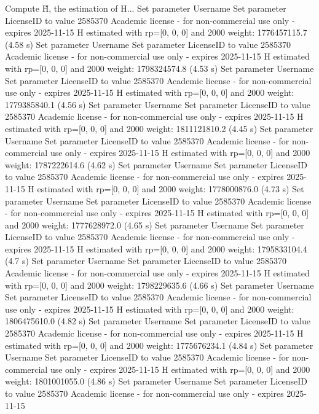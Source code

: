 Compute H̃, the estimation of H...
Set parameter Username
Set parameter LicenseID to value 2585370
Academic license - for non-commercial use only - expires 2025-11-15
  H estimated with rp=[0, 0, 0] and 2000 weight:  1776457115.7  (4.58 s)
Set parameter Username
Set parameter LicenseID to value 2585370
Academic license - for non-commercial use only - expires 2025-11-15
  H estimated with rp=[0, 0, 0] and 2000 weight:  1798324574.8  (4.53 s)
Set parameter Username
Set parameter LicenseID to value 2585370
Academic license - for non-commercial use only - expires 2025-11-15
  H estimated with rp=[0, 0, 0] and 2000 weight:  1779385840.1  (4.56 s)
Set parameter Username
Set parameter LicenseID to value 2585370
Academic license - for non-commercial use only - expires 2025-11-15
  H estimated with rp=[0, 0, 0] and 2000 weight:  1811121810.2  (4.45 s)
Set parameter Username
Set parameter LicenseID to value 2585370
Academic license - for non-commercial use only - expires 2025-11-15
  H estimated with rp=[0, 0, 0] and 2000 weight:  1787222614.6  (4.62 s)
Set parameter Username
Set parameter LicenseID to value 2585370
Academic license - for non-commercial use only - expires 2025-11-15
  H estimated with rp=[0, 0, 0] and 2000 weight:  1778000876.0  (4.73 s)
Set parameter Username
Set parameter LicenseID to value 2585370
Academic license - for non-commercial use only - expires 2025-11-15
  H estimated with rp=[0, 0, 0] and 2000 weight:  1777628972.0  (4.65 s)
Set parameter Username
Set parameter LicenseID to value 2585370
Academic license - for non-commercial use only - expires 2025-11-15
  H estimated with rp=[0, 0, 0] and 2000 weight:  1795833104.4  (4.7 s)
Set parameter Username
Set parameter LicenseID to value 2585370
Academic license - for non-commercial use only - expires 2025-11-15
  H estimated with rp=[0, 0, 0] and 2000 weight:  1798229635.6  (4.66 s)
Set parameter Username
Set parameter LicenseID to value 2585370
Academic license - for non-commercial use only - expires 2025-11-15
  H estimated with rp=[0, 0, 0] and 2000 weight:  1806475610.0  (4.82 s)
Set parameter Username
Set parameter LicenseID to value 2585370
Academic license - for non-commercial use only - expires 2025-11-15
  H estimated with rp=[0, 0, 0] and 2000 weight:  1775676234.1  (4.84 s)
Set parameter Username
Set parameter LicenseID to value 2585370
Academic license - for non-commercial use only - expires 2025-11-15
  H estimated with rp=[0, 0, 0] and 2000 weight:  1801001055.0  (4.86 s)
Set parameter Username
Set parameter LicenseID to value 2585370
Academic license - for non-commercial use only - expires 2025-11-15
